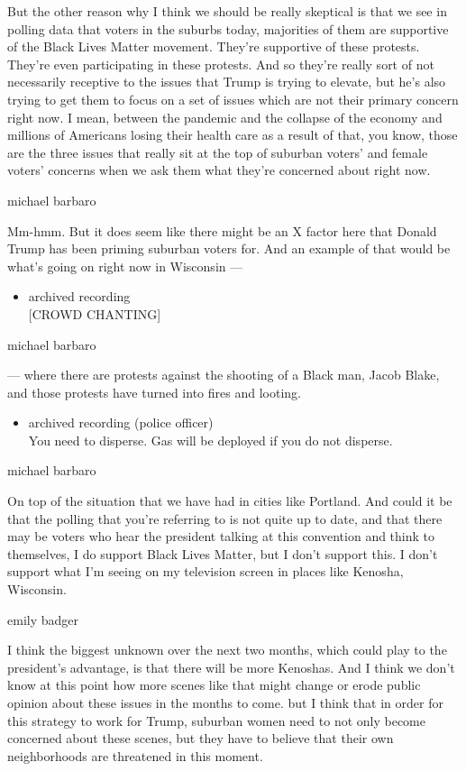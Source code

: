 But the other reason why I think we should be really skeptical is that
we see in polling data that voters in the suburbs today, majorities of
them are supportive of the Black Lives Matter movement. They're
supportive of these protests. They're even participating in these
protests. And so they're really sort of not necessarily receptive to the
issues that Trump is trying to elevate, but he's also trying to get them
to focus on a set of issues which are not their primary concern right
now. I mean, between the pandemic and the collapse of the economy and
millions of Americans losing their health care as a result of that, you
know, those are the three issues that really sit at the top of suburban
voters' and female voters' concerns when we ask them what they're
concerned about right now.

michael barbaro

Mm-hmm. But it does seem like there might be an X factor here that
Donald Trump has been priming suburban voters for. And an example of
that would be what's going on right now in Wisconsin ---

\begin{itemize}
\tightlist
\item
  archived recording\\
  {[}CROWD CHANTING{]}
\end{itemize}

michael barbaro

--- where there are protests against the shooting of a Black man, Jacob
Blake, and those protests have turned into fires and looting.

\begin{itemize}
\tightlist
\item
  archived recording (police officer)\\
  You need to disperse. Gas will be deployed if you do not disperse.
\end{itemize}

michael barbaro

On top of the situation that we have had in cities like Portland. And
could it be that the polling that you're referring to is not quite up to
date, and that there may be voters who hear the president talking at
this convention and think to themselves, I do support Black Lives
Matter, but I don't support this. I don't support what I'm seeing on my
television screen in places like Kenosha, Wisconsin.

emily badger

I think the biggest unknown over the next two months, which could play
to the president's advantage, is that there will be more Kenoshas. And I
think we don't know at this point how more scenes like that might change
or erode public opinion about these issues in the months to come. but I
think that in order for this strategy to work for Trump, suburban women
need to not only become concerned about these scenes, but they have to
believe that their own neighborhoods are threatened in this moment.


